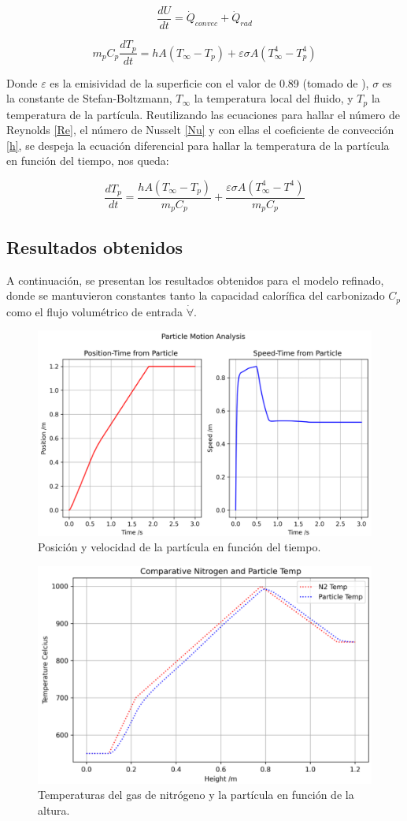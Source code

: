 \documentclass[11pt,stdletter,orderfromtodate,sigleft,twoside]{report}
\begin{document}
\begin{equation}
    \frac{dU}{dt}=\dot{Q}_{convec}+\dot{Q}_{rad}
\end{equation}

\[
    m_{p}C_{p}\frac{dT_{p}}{dt}=hA(T_{\infty }-T_{p})+\varepsilon\sigma A(T_{\infty }^{4}-T_{p}^{4})
\]

Donde $\varepsilon$ es la emisividad de la superficie con el valor de 0.89 (tomado de \cite{etde_20278019}), $\sigma$ es la constante de Stefan-Boltzmann, $T_{\infty}$ la temperatura local del fluido, y $T_{p}$ la temperatura de la partícula. Reutilizando las ecuaciones para hallar el número de Reynolds \ref{Re}, el número de Nusselt \ref{Nu} y con ellas el coeficiente de convección \ref{h}, se despeja la ecuación diferencial para hallar la temperatura de la partícula en función del tiempo, nos queda:

\begin{equation}
    \frac{dT_{p}}{dt}=\frac{hA(T_{\infty }-T_{p})}{m_{p}C_{p}}+\frac{\varepsilon\sigma A(T_{\infty }^{4}-T^{4})}{m_{p}C_{p}}
\end{equation}

\subsection{Resultados obtenidos}

A continuación, se presentan los resultados obtenidos para el modelo refinado, donde se mantuvieron constantes tanto la capacidad calorífica del carbonizado $C_p$ como el flujo volumétrico de entrada $\dot{\forall}$.

\begin{figure}[H]
    \centering
    \includegraphics[width=0.6\linewidth]{figures/Rad1.png}
    \caption{Posición y velocidad de la partícula en función del tiempo.}
    \label{fig:enter-label}
\end{figure}

\begin{figure}[H]
    \centering
    \includegraphics[width=0.5\linewidth]{figures/Rad2.png}
    \caption{Temperaturas del gas de nitrógeno y la partícula en función de la altura.}
    \label{fig:enter-label}
\end{figure}
\end{document}
